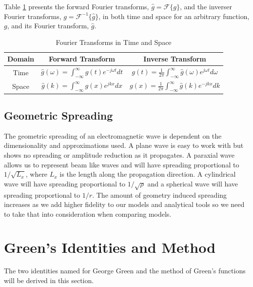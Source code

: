 Table \ref{gf_tab:0a} presents the forward Fourier transforms, $\hat{g} = \mathcal{F}\{g\}$, and the inverser Fourier transforms, $g = \mathcal{F}^{-1}\{\hat{g}\}$, in both time and space for an arbitrary function, $g$, and its Fourier transform, $\hat{g}$.
\begin{table}[ht]
  \begin{center}
      \renewcommand{\baselinestretch}{1} \small\normalsize
  \begin{quote}
    \caption[Fourier Transforms in Time and Space]{Fourier Transforms in Time and Space\label{gf_tab:0a}}
  \end{quote}
  \begin{tabular} {|c | c | c|}
    \hline
  \bf{Domain} & \bf{Forward Transform} & \bf{Inverse Transform}\\ \hline
  Time & $\displaystyle \hat{g}(\omega) = \int_{-\infty}^{\infty} g(t)e^{-j\omega t}dt$ & $\displaystyle  g(t) = \frac{1}{2\pi}\int_{-\infty}^\infty \hat{g}(\omega)e^{j\omega t}d\omega$\\ \hline
 Space & $\displaystyle \hat{g}(k) = \int_{-\infty}^{\infty} g(x)e^{jk x}dx$ & $\displaystyle  g(x) = \frac{1}{2\pi}\int_{-\infty}^\infty \hat{g}(k)e^{-jk x}dk$\\ \hline
\end{tabular}
\end{center}
\end{table}
\renewcommand{\baselinestretch}{2} \small\normalsize

\subsection{Geometric Spreading}
The geometric spreading of an electromagnetic wave is dependent on the dimensionality and approximations used. A plane wave is easy to work with but shows no spreading or amplitude reduction as it propagates. A paraxial wave allows us to represent beam like waves and will have spreading proportional to $1/\sqrt{L_x}$, where $L_x$ is the length along the propagation direction. A cylindrical wave will have spreading proportional to $1/\sqrt{\rho}$ and a spherical wave will have spreading proportional to $1/r$. The amount of geometry induced spreading increases as we add higher fidelity to our models and analytical tools so we need to take that into consideration when comparing models.

\section {Green's Identities and Method}
The two identities named for George Green and the method of Green’s functions will be derived in this section.

